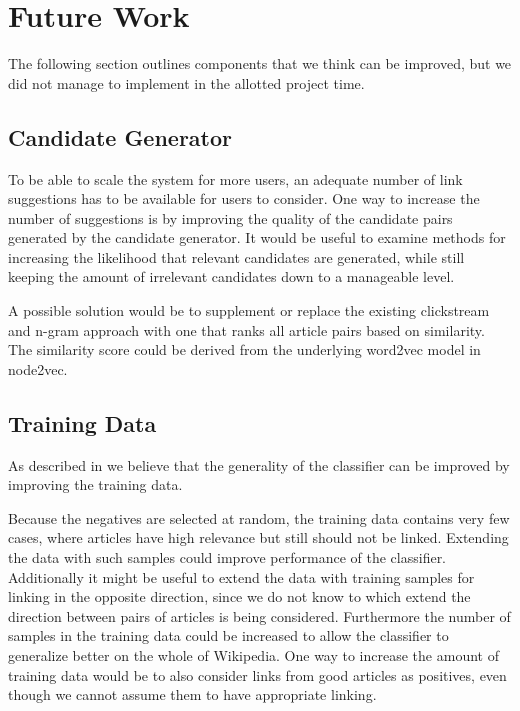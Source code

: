 


\section{Future Work}\label{sec:future_work}
The following section outlines components that we think can be improved, but we did not manage to implement in the allotted project time.

\subsection{Candidate Generator}
To be able to scale the system for more users, an adequate number of link suggestions has to be available for users to consider. One way to increase the number of suggestions is by improving the quality of the candidate pairs generated by the candidate generator. It would be useful to examine methods for increasing the likelihood that relevant candidates are generated, while still keeping the amount of irrelevant candidates down to a manageable level.

A possible solution would be to supplement or replace the existing clickstream and n-gram approach with one that ranks all article pairs based on similarity. The similarity score could be derived from the underlying word2vec model in node2vec.

\subsection{Training Data}
As described in  we believe that the generality of the classifier can be improved by improving the training data.

Because the negatives are selected at random, the training data contains very few cases, where articles have high relevance but still should not be linked. Extending the data with such samples could improve performance of the classifier. Additionally it might be useful to extend the data with training samples for linking in the opposite direction, since we do not know to which extend the direction between pairs of articles is being considered. Furthermore the number of samples in the training data could be increased to allow the classifier to generalize better on the whole of Wikipedia. One way to increase the amount of training data would be to also consider links from good articles as positives, even though we cannot assume them to have appropriate linking.

